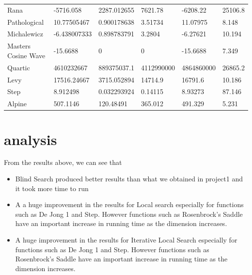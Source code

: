 \documentclass[12pt]{article}
\begin{document}
\begin{table}[h]
\begin{tabular}{llllll}
			Rana                    & -5716.058        & 2287.012655       & 7621.78        & -6208.22        & 25106.8        \\
			Pathological            & 10.77505467      & 0.900178638       & 3.51734        & 11.07975        & 8.148          \\
			Michalewicz             & -6.438007333     & 0.898783791       & 3.2804         & -6.27621        & 10.194         \\
			Masters Cosine Wave  & -15.6688         & 0                 & 0              & -15.6688        & 7.349          \\
			Quartic                 & 4610232667       & 889375037.1       & 4112990000     & 4864860000      & 26865.2        \\
			Levy                    & 17516.24667      & 3715.052894       & 14714.9        & 16791.6         & 10.186         \\
			Step                    & 8.912498         & 0.032293924       & 0.14115        & 8.93273         & 87.146         \\
			Alpine                  & 507.1146         & 120.48491         & 365.012        & 491.329         & 5.231          \\
			\hline
		\end{tabular}
	\end{table}
	\newpage
	\section{analysis}
	From the results above, we can see that 
		\begin{itemize}
			\item Blind Search produced better results than what we obtained in project1 and it took more time to run
			\item A a huge improvement in the results for Local search especially for functions such as De Jong 1 and Step. However functions such as Rosenbrock's Saddle have an important increase in running time as the dimension increases.
			\item A huge improvement in the results for Iterative Local Search especially for functions such as De Jong 1 and Step. However functions such as Rosenbrock's Saddle have an important increase in running time as the dimension increases.
		\end{itemize}
\end{document}
